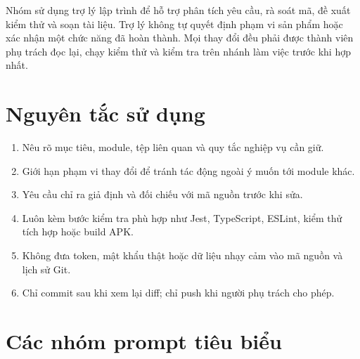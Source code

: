 Nhóm sử dụng trợ lý lập trình để hỗ trợ phân tích yêu cầu, rà soát mã, đề xuất kiểm thử và soạn tài liệu. Trợ lý không tự quyết định phạm vi sản phẩm hoặc xác nhận một chức năng đã hoàn thành. Mọi thay đổi đều phải được thành viên phụ trách đọc lại, chạy kiểm thử và kiểm tra trên nhánh làm việc trước khi hợp nhất.

\section{Nguyên tắc sử dụng}

\begin{enumerate}
  \item Nêu rõ mục tiêu, module, tệp liên quan và quy tắc nghiệp vụ cần giữ.
  \item Giới hạn phạm vi thay đổi để tránh tác động ngoài ý muốn tới module khác.
  \item Yêu cầu chỉ ra giả định và đối chiếu với mã nguồn trước khi sửa.
  \item Luôn kèm bước kiểm tra phù hợp như Jest, TypeScript, ESLint, kiểm thử tích hợp hoặc build APK.
  \item Không đưa token, mật khẩu thật hoặc dữ liệu nhạy cảm vào mã nguồn và lịch sử Git.
  \item Chỉ commit sau khi xem lại diff; chỉ push khi người phụ trách cho phép.
\end{enumerate}

\section{Các nhóm prompt tiêu biểu}

